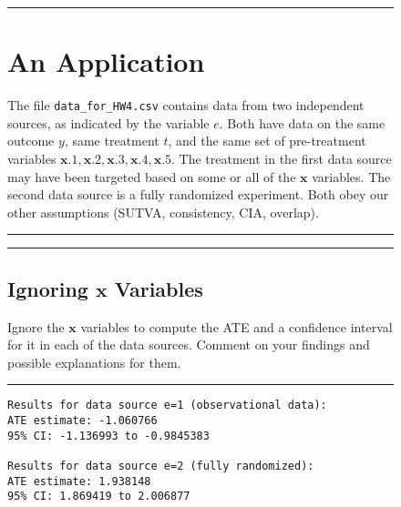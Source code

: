 \documentclass{article}
\newenvironment{colorparagraph}[1]{\par\color{#1}}{\par}
\begin{document}
\begin{figure}[H]
  \begin{colorparagraph}{questioncolor}
  \rule{\textwidth}{0.5pt}
  \label{q3}
  \section{An Application}

  The file \texttt{data\_for\_HW4.csv} contains data from two independent sources, as indicated by the variable \( e \). Both have data on the same outcome \( y \), same treatment \( t \), and the same set of pre-treatment variables \( \mathbf{x}.1, \mathbf{x}.2, \mathbf{x}.3, \mathbf{x}.4, \mathbf{x}.5 \). The treatment in the first data source may have been targeted based on some or all of the \( \mathbf{x} \) variables. The second data source is a fully randomized experiment. Both obey our other assumptions (SUTVA, consistency, CIA, overlap).

  \rule{\textwidth}{0.5pt}
  \end{colorparagraph}
\end{figure}

\begin{figure}[H]
  \begin{colorparagraph}{questioncolor}
  \rule{\textwidth}{0.5pt}
  \label{q3a}
  \subsection{Ignoring \( \mathbf{x} \) Variables}

  Ignore the \( \mathbf{x} \) variables to compute the ATE and a confidence interval for it in each of the data sources. Comment on your findings and possible explanations for them.

  \rule{\textwidth}{0.5pt}
  \end{colorparagraph}
\end{figure}

\begin{figure}[H]
  \begin{lstlisting}[style=RstyleComment, caption=ATE and Confidence Interval Estimates Ignoring Covariates]
Results for data source e=1 (observational data):
ATE estimate: -1.060766 
95% CI: -1.136993 to -0.9845383 

Results for data source e=2 (fully randomized):
ATE estimate: 1.938148 
95% CI: 1.869419 to 2.006877 
  \end{lstlisting}
\end{figure}
\end{document}
